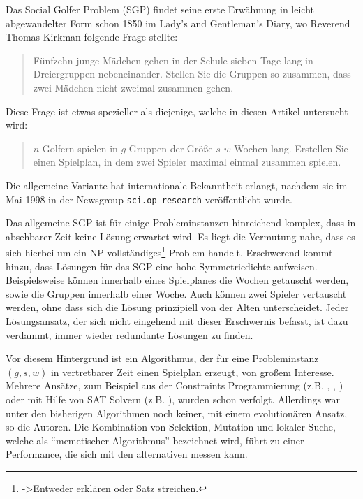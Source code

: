 Das Social Golfer Problem (SGP) findet seine erste Erwähnung in leicht abgewandelter Form schon 1850 im Lady's and Gentleman's Diary, wo Reverend Thomas Kirkman folgende Frage stellte:

\begin{quote}
Fünfzehn junge Mädchen gehen in der Schule sieben Tage lang in Dreiergruppen nebeneinander. Stellen Sie die Gruppen so zusammen, dass zwei Mädchen nicht zweimal zusammen gehen.
\end{quote}
Diese Frage ist etwas spezieller als diejenige, welche in diesen Artikel untersucht wird:
\begin{quote}
$n$ Golfern spielen in $g$ Gruppen der Größe $s$ $w$ Wochen lang. Erstellen Sie einen Spielplan, in dem zwei Spieler maximal einmal zusammen spielen.
\end{quote}
Die allgemeine Variante hat internationale Bekanntheit erlangt, nachdem sie im Mai 1998 in der Newsgroup \texttt{sci.op-research} veröffentlicht wurde.

Das allgemeine SGP ist für einige Probleminstanzen hinreichend komplex, dass in absehbarer Zeit keine Lösung erwartet wird. Es liegt die Vermutung nahe, dass es sich hierbei um ein NP-vollständiges\footnote{->Entweder erklären oder Satz streichen.} Problem handelt.
Erschwerend kommt hinzu, dass Lösungen für das SGP eine hohe Symmetriedichte aufweisen. Beispielsweise können innerhalb eines Spielplanes die Wochen getauscht werden, sowie die Gruppen innerhalb einer Woche. Auch können zwei Spieler vertauscht werden, ohne dass sich die Lösung prinzipiell von der Alten unterscheidet. Jeder Lösungsansatz, der sich nicht eingehend mit dieser Erschwernis befasst, ist dazu verdammt, immer wieder redundante Lösungen zu finden.

Vor diesem Hintergrund ist ein Algorithmus, der für eine Probleminstanz $(g,s,w)$ in vertretbarer Zeit einen Spielplan erzeugt, von großem Interesse.
Mehrere Ansätze, zum Beispiel aus der Constraints Programmierung (z.B. \cite{fahle01}, \cite{smith01}, \cite{sellmann02}) oder mit Hilfe von SAT Solvern (z.B. \cite{triska08}), wurden schon verfolgt. Allerdings war unter den bisherigen Algorithmen noch keiner, mit einem evolutionären Ansatz, so die Autoren. 
Die Kombination von Selektion, Mutation und lokaler Suche, welche als \enquote{memetischer Algorithmus} bezeichnet wird, führt zu einer Performance, die sich mit den alternativen messen kann.


